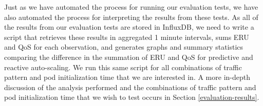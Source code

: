 Just as we have automated the process for running our evaluation tests, we have
also automated the process for interpreting the results from these tests. As all
of the results from our evaluation tests are stored in InfluxDB, we need to
write a script that retrieves these results in aggregated 1 minute intervals,
sums ERU and QoS for each observation, and generates graphs and summary
statistics comparing the difference in the summation of ERU and QoS for
predictive and reactive auto-scaling. We run this same script for all
combinations of traffic pattern and pod initialization time that we are
interested in. A more in-depth discussion of the analysis performed and the
combinations of traffic pattern and pod initialization time that we wish to test
occurs in Section \ref{evaluation-results}.
